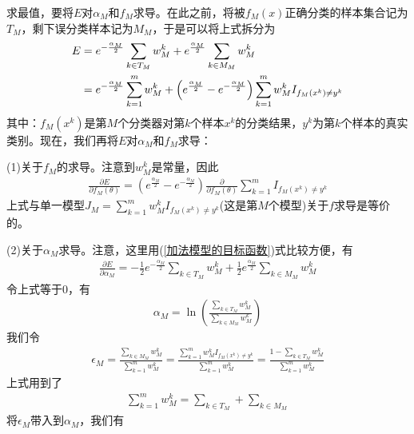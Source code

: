           求最值，要将$E$对$\alpha_M$和$f_M$求导。在此之前，将被$f_M(x)$正确分类的样本集合记为$T_M$，剩下误分类样本记为$M_M$，于是可以将上式拆分为
          \begin{align}
          \label{加法模型的目标函数}
          E & = e^{-\frac{\alpha_M}{2}} \sum_{k\in T_M}w_M^k + e^{\frac{\alpha_M}{2}} \sum_{k\in M_M}w_M^k \\
          & = e^{-\frac{\alpha_M}{2}}\sum_{k=1}^m w_M^k + \left( e^{\frac{\alpha_M}{2}} - e^{-\frac{\alpha_M}{2}} \right)  \sum_{k=1}^mw_M^k I_{f_M(x^k) \neq y^k} \notag
          \end{align}
          其中：$f_M(x^k)$是第$M$个分类器对第$k$个样本$x^k$的分类结果，$y^k$为第$k$个样本的真实类别。现在，我们再将$E$对$\alpha_M$和$f_M$求导：
          \par
          (1)关于$f_M$的求导。注意到$w_M^k$是常量，因此
          \begin{align*}
          \frac{\partial E}{\partial f_M(\theta)} = \left( e^{\frac{\alpha_M}{2}} - e^{-\frac{\alpha_M}{2}} \right) \frac{\partial }{\partial f_M(\theta)}\sum_{k=1}^m I_{f_M(x^k)\neq y^k}
          \end{align*}
          上式与单一模型$J_M = \sum_{k=1}^m w_M^k I_{f_M(x^k)\neq y^k} $(这是第$M$个模型)关于$f$求导是等价的。
          \par
          (2)关于$\alpha_M$求导。注意，这里用(\ref{加法模型的目标函数})式比较方便，有
          \begin{align*}
          \frac{\partial E}{\partial \alpha_M} = -\frac{1}{2}e^{-\frac{\alpha_M}{2}}\sum_{k\in T_M}w_M^k + \frac{1}{2} e^{\frac{\alpha_M}{2}}\sum_{k\in M_M}w_M^k
          \end{align*}
          令上式等于0，有
          \begin{align*}
          \alpha_M = \ln \left( \frac{\sum\limits_{k\in T_M}w_M^k}{\sum\limits_{k\in M_M}w_M^k} \right)
          \end{align*}
          我们令
          \begin{align*}
          \epsilon_M = \frac{\sum\limits_{k\in M_M}w_M^k }{\sum\limits_{k=1}^m w_M^k} = \frac{\sum\limits_{k=1}^mw_M^kI_{f_M(x^k)\neq y^k}}{\sum\limits_{k=1}^m w_M^k} = \frac{1-\sum\limits_{k\in T_M} w_M^k}{\sum\limits_{k=1}^m w_M^k}
          \end{align*}
          上式用到了
          \begin{align*}
          \sum_{k=1}^m w_M^k = \sum_{k\in T_M} + \sum_{k\in M_M}
          \end{align*}
          将$\epsilon_M$带入到$\alpha_M$，我们有
